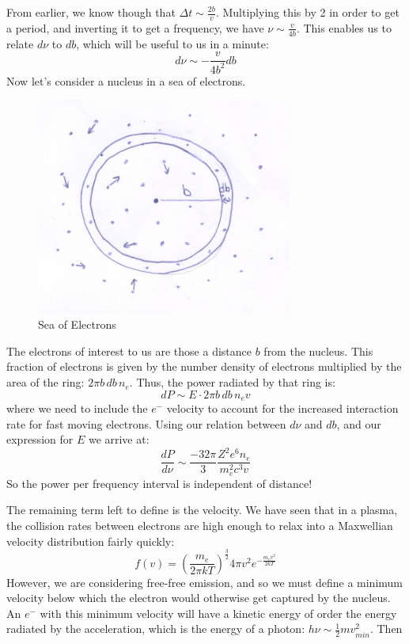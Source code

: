 \documentclass{article}
\def\hf{\frac12}
\def\hf{\frac12}
\begin{document}
From earlier, we know though that $\Delta t\sim\frac{2b }{ v}$.  Multiplying this by 2 in order to get a period, and inverting it to get a frequency, we have $\nu\sim\frac{v }{ 4b}$.  
This enables us to relate $d\nu$ to
$db$, which will be useful to us in a minute:
$$d\nu\sim{-\frac{v}{4b^2}}db$$
Now let's consider a nucleus in a sea of electrons.  
\begin{figure}
    \centering
    \includegraphics[width=0.75\textwidth]{figures/707px-ElectronSea.jpg}
    \caption{Sea of Electrons}
    \label{fig:sea}
\end{figure}
The electrons of interest to us are those a distance $b$ from the nucleus.  This fraction of electrons is given by the number density of electrons multiplied by the area of the ring: $2\pi b\,db\,n_e$.
Thus, the power radiated by that ring is:
$$dP\sim E\cdot 2\pi b\,db\,n_ev$$
where we need to include the $e^-$ velocity to account for the increased interaction rate for fast moving electrons. 
Using our relation between $d\nu$ and $db$, and our expression for $E$ we arrive at:
$$\frac{dP}{ d\nu}\sim\frac{-32\pi}{3}\frac{Z^2e^6n_e}{ m_e^2c^3v}$$
So the power per frequency interval is independent of distance!\par
The remaining term left to define is the velocity.  We have seen that in a plasma, the collision rates between electrons are high enough to relax into a Maxwellian velocity distribution fairly quickly:
$$f(v)=\left(\frac{m_e}{2\pi kT}\right)^\frac{3}{2}4\pi v^2 e^{-\frac{m_ev^2}{2kT}}$$
However, we are considering free-free emission, and so we must define a minimum velocity below which the electron would otherwise get captured by the nucleus. An $e^-$ with this minimum velocity will have a kinetic energy of order the energy radiated by the acceleration, which is the energy of a photon: $h\nu\sim\hf mv_{min}^2$.  Then
\end{document}
